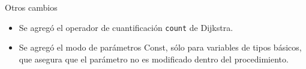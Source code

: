 \begin{frame}{Otros cambios}
\begin{itemize}
  \item Se agregó el operador de cuantificación \texttt{count} de Dijkstra. \countquant{}

  \item Se agregó el modo de parámetros Const, sólo para variables de tipos básicos, que asegura que el parámetro no es modificado dentro del procedimiento. \constmode{}

\end{itemize}
\end{frame}






